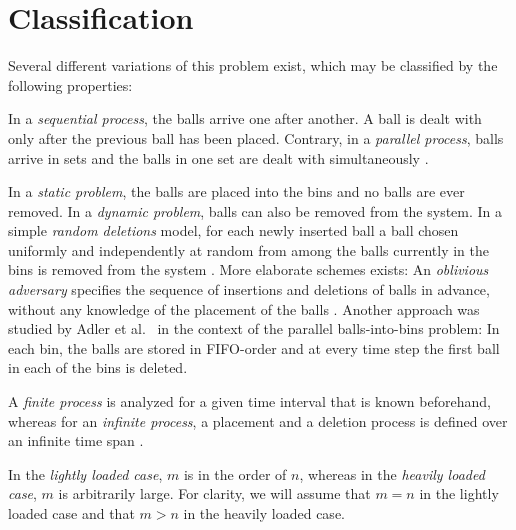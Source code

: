 \documentclass[a4paper,12pt]{article}
\begin{document}
\begin{comment}
In Section \ref{sec:strategies}, we will provide asymptotic bounds for the ad dative gap of this strategy, which we will then use to devise more complex strategies that significantly reduce these bounds. 
\end{comment}

\begin{comment}
These result may sometimes seem surprising, which is why we will denote a significant part of this article to demonstrate proofs in detail. This proof technique may be useful for devising asymptotic bounds for the additive gap of different balls-into-bins scenarios and strategies.
\end{comment}


\section{Classification}
\label{sec:classification}
Several different variations of this problem exist, which may be classified by the following properties:
\begin{compactitem}
\item In a \emph{sequential process}, the balls arrive one after another. A  ball is dealt with only after the previous ball has been placed. Contrary, in a \emph{parallel process}, balls arrive in sets and the balls in one set are dealt with simultaneously \cite{ABS98}. 
\item In a \emph{static problem}, the balls are placed into the bins and no balls are ever removed. In a \emph{dynamic problem}, balls can also be removed from the system. In a simple \emph{random deletions} model, for each newly inserted ball a ball chosen uniformly and independently at random from among the balls currently in the bins is removed from the system \cite{ABKU99} \cite{MRS01}. More elaborate schemes exists: An \emph{oblivious adversary} specifies the sequence of insertions and deletions of balls in advance, without any knowledge of the placement of the balls \cite{CFM+98}. Another approach was studied by Adler et al.~\cite{ABS98} in the context of the parallel balls-into-bins problem: In each bin, the balls are stored in FIFO-order and at every time step the first ball in each of the bins is deleted. 
\item A \emph{finite process} is analyzed for a given time interval that is known beforehand, whereas for an \emph{infinite process}, a placement and a deletion process is defined over an infinite time span \cite{ABS98}.
\item In the \emph{lightly loaded case}, $m$ is in the order of $n$, whereas in the \emph{heavily loaded case}, $m$ is arbitrarily large. For clarity, we will assume that $m = n$ in the lightly loaded case and that $m > n$ in the heavily loaded case. 
\end{compactitem}
\end{document}
